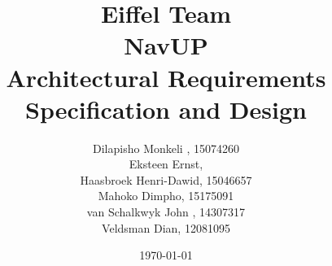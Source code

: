 \documentclass[12pt]{article}
\begin{document}
	\title{\Huge Eiffel Team \\ NavUP \\ Architectural Requirements Specification and Design}
	\author{\Large Dilapisho Monkeli , 15074260 \\
		\Large Eksteen Ernst,  \\
		\Large Haasbroek Henri-Dawid, 15046657 \\
		\Large Mahoko  Dimpho, 15175091 \\
		\Large van Schalkwyk John  , 14307317 \\
		\Large Veldsman Dian, 12081095}
	\date{\today}
	\maketitle
\end{document}
